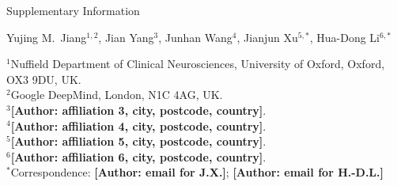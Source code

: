\documentclass[11pt,a4paper]{article}
\newcommand{\authorpending}[1]{{\color{red}\textbf{[Author: #1]}}}
\begin{document}
{\large Supplementary Information\par}\vspace{1.2em}
\vspace{1.1em}
{\large Yujing M.\ Jiang$^{1,2}$, Jian Yang$^{3}$, Junhan Wang$^{4}$, Jianjun Xu$^{5,*}$, Hua-Dong Li$^{6,*}$\par}
\vspace{0.9em}
{\small\raggedright
$^{1}$Nuffield Department of Clinical Neurosciences, University of Oxford, Oxford, OX3 9DU, UK.\\
$^{2}$Google DeepMind, London, N1C 4AG, UK.\\
$^{3}$\authorpending{affiliation 3, city, postcode, country}.\\
$^{4}$\authorpending{affiliation 4, city, postcode, country}.\\
$^{5}$\authorpending{affiliation 5, city, postcode, country}.\\
$^{6}$\authorpending{affiliation 6, city, postcode, country}.\\
$^{*}$Correspondence: \authorpending{email for J.X.}; \authorpending{email for H.-D.L.}\par}

\vspace{0.6em}

\tableofcontents
\clearpage
\end{document}
